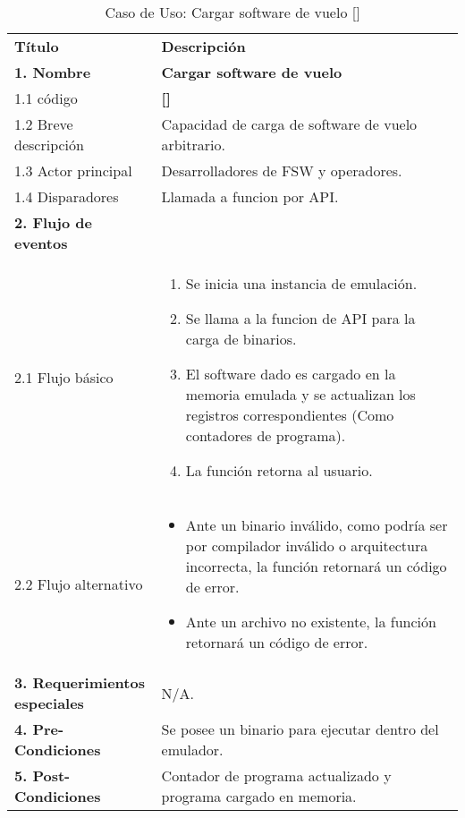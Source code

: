 \documentclass[
  11pt, %
  codirector, %
]{charter}
\makeatletter
\newcommand{\mytwodigits}[1]{\two@digits{#1}}
\newcounter{reqCounter}
\makeatother
\begin{document}
\begin{table}[h!]
	\caption{Caso de Uso: Cargar software de vuelo [\CODrequerimiento\mytwodigits{\value{reqCounter}}]}
	\centering
	\begin{tabular}{ | m{4.0cm} | m{10cm} | }
		\hline
		\rowcolor{gray!50} %
		\textbf{Título} & \textbf{Descripción} \\ %
		\textbf{1. Nombre} & \textbf{Cargar software de vuelo} \\
		1.1 código &\textbf{[\CODrequerimiento\mytwodigits{\value{reqCounter}}]} \\
		1.2 Breve descripción & Capacidad de carga de software de vuelo arbitrario. \\
		1.3 Actor principal & Desarrolladores de FSW y operadores. \\
		1.4 Disparadores & Llamada a funcion por API. \\ \hline
		\textbf{2. Flujo de eventos} &  \\
		2.1 Flujo básico &
		\begin{enumerate}
			\item Se inicia una instancia de emulación.
      \item Se llama a la funcion de API para la carga de binarios.
      \item El software dado es cargado en la memoria emulada y se actualizan los registros correspondientes (Como contadores de programa).
      \item La función retorna al usuario.
		\end{enumerate} \\
		2.2 Flujo alternativo &
		\begin{itemize}
			\item Ante un binario inválido, como podría ser por compilador inválido o arquitectura incorrecta, la función retornará un código de error.
			\item Ante un archivo no existente, la función retornará un código de error.
		\end{itemize} \\ \hline
		\textbf{3. Requerimientos especiales} & N/A. \\ \hline
		\textbf{4. Pre-Condiciones} & Se posee un binario para ejecutar dentro del emulador. \\ \hline
		\textbf{5. Post-Condiciones} & Contador de programa actualizado y programa cargado en memoria. \\ \hline
	\end{tabular}

\end{table}
\end{document}
